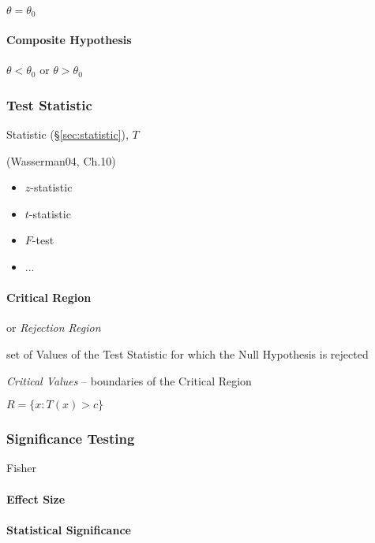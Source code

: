 $\theta = \theta_0$



\paragraph{Composite Hypothesis}\label{sec:composite_hypothesis}\hfill

$\theta < \theta_0$ or $\theta > \theta_0$



\subsubsection{Test Statistic}\label{sec:test_statistic}

Statistic (\S\ref{sec:statistic}), $T$

(Wasserman04, Ch.10)

\begin{itemize}
  \item $z$-statistic
  \item $t$-statistic
  \item $F$-test
  \item ...
\end{itemize}



\paragraph{Critical Region}\label{sec:critical_region}\hfill

or \emph{Rejection Region}

set of Values of the Test Statistic for which the Null Hypothesis is rejected

\emph{Critical Values} -- boundaries of the Critical Region

$R = \{ x : T(x) > c \}$



\subsubsection{Significance Testing}\label{sec:significance_testing}

Fisher



\paragraph{Effect Size}\label{sec:effect_size}\hfill

\paragraph{Statistical Significance}\label{sec:statistical_significance}\hfill


